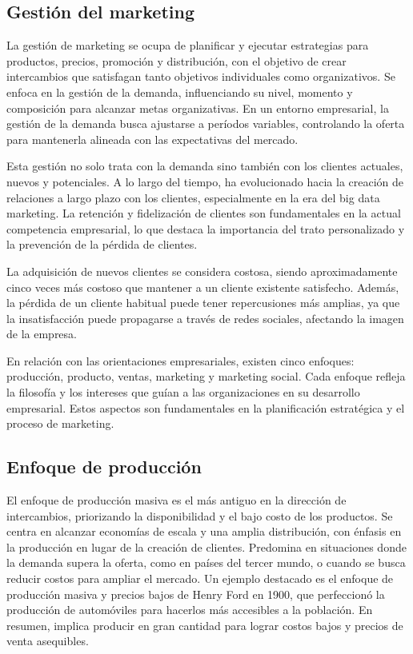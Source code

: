 \documentclass[
    a4paper, %
    10pt, %
    unnumberedsections, %
    twoside, %
]{LTJournalArticle}
\begin{document}
\subsection{Gestión del marketing}

La gestión de marketing se ocupa de planificar y ejecutar estrategias para productos, precios, promoción y distribución, con el objetivo de crear intercambios que satisfagan tanto objetivos individuales como organizativos. Se enfoca en la gestión de la demanda, influenciando su nivel, momento y composición para alcanzar metas organizativas. En un entorno empresarial, la gestión de la demanda busca ajustarse a períodos variables, controlando la oferta para mantenerla alineada con las expectativas del mercado.

Esta gestión no solo trata con la demanda sino también con los clientes actuales, nuevos y potenciales. A lo largo del tiempo, ha evolucionado hacia la creación de relaciones a largo plazo con los clientes, especialmente en la era del big data marketing. La retención y fidelización de clientes son fundamentales en la actual competencia empresarial, lo que destaca la importancia del trato personalizado y la prevención de la pérdida de clientes.

La adquisición de nuevos clientes se considera costosa, siendo aproximadamente cinco veces más costoso que mantener a un cliente existente satisfecho. Además, la pérdida de un cliente habitual puede tener repercusiones más amplias, ya que la insatisfacción puede propagarse a través de redes sociales, afectando la imagen de la empresa.

En relación con las orientaciones empresariales, existen cinco enfoques: producción, producto, ventas, marketing y marketing social. Cada enfoque refleja la filosofía y los intereses que guían a las organizaciones en su desarrollo empresarial. Estos aspectos son fundamentales en la planificación estratégica y el proceso de marketing.


\subsection{Enfoque de producción}

El enfoque de producción masiva es el más antiguo en la dirección de intercambios, priorizando la disponibilidad y el bajo costo de los productos. Se centra en alcanzar economías de escala y una amplia distribución, con énfasis en la producción en lugar de la creación de clientes. Predomina en situaciones donde la demanda supera la oferta, como en países del tercer mundo, o cuando se busca reducir costos para ampliar el mercado. Un ejemplo destacado es el enfoque de producción masiva y precios bajos de Henry Ford en 1900, que perfeccionó la producción de automóviles para hacerlos más accesibles a la población. En resumen, implica producir en gran cantidad para lograr costos bajos y precios de venta asequibles.
\end{document}
